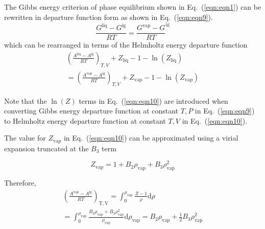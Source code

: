 \documentclass[%
 aip,
 jcp,
 sd,%
 amsmath,amssymb,
 reprint,%
]{revtex4-1}
\begin{document}
The Gibbs energy criterion of phase equilibrium shown in Eq.~(\ref{eqn:eqn1}) can be rewritten in departure function form as shown in Eq.~(\ref{eqn:eqn9}).
\begin{equation}
\frac{G^{\mathrm{liq}} -G^{\mathrm{ig}} }{RT} =\frac{G^{\mathrm{vap}} -G}{RT} ^{\mathrm{ig}} \label{eqn:eqn9}
\end{equation}
which can be rearranged in terms of the Helmholtz energy departure function
\begin{equation}
\begin{array}{l}
{\left(\frac{A^{\mathrm{liq}} -A^{\mathrm{ig}} }{RT} \right)_{T,V} +Z_{\mathrm{liq}} -1-\ln(Z_{\mathrm{liq}})} 
\\ 
{=\left(\frac{A^{\mathrm{vap}} -A^{\mathrm{ig}} }{RT} \right)_{T,V} +Z_{\mathrm{vap}} -1-\ln(Z_{\mathrm{vap}})}  
\end{array} 
\label{eqn:eqn10}
\end{equation}

Note that the $\ln(Z)$ terms in Eq.~(\ref{eqn:eqn10}) are introduced when converting Gibbs energy departure function at constant $T,P$ in Eq.~(\ref{eqn:eqn9}) to Helmholtz energy departure function at constant $T,V$ in Eq.~(\ref{eqn:eqn10}).

The value for $Z_{\mathrm{vap}}$ in Eq.~(\ref{eqn:eqn10}) can be approximated using a virial expansion truncated at the $B_3$ term

\begin{equation}
{Z_{\mathrm{vap}}} = 1 + {B_2}{\rho_{\mathrm{vap}}} + {B_3}\rho_{\mathrm{vap}}^2
\label{eqn:eqn11}
\end{equation}

Therefore, 
\begin{equation}
\begin{array}{l}{\left( {\frac{{{A^{\mathrm{vap}}} - {A^{\mathrm{ig}}}}}{{RT}}} \right)_{\mathrm{T,V}}} = \int_0^{{\rho _{\mathrm{vap}}}} {\frac{{Z - 1}}{\rho } \mathrm{d}\rho } \\ = \int_0^{{\rho
_{\mathrm{vap}}}} {\frac{{{B_2}{\rho _{\mathrm{vap}}} + {B_3}\rho _{\mathrm{vap}}^2}}{\rho_{\mathrm{vap}} } \mathrm{d}\rho_{\mathrm{vap}} } = {B_2}{\rho _{\mathrm{vap}}} + \frac{1}{2}{B_3}\rho _{\mathrm{vap}}^2\end{array} \label{eqn:eqn12}
\end{equation}
\end{document}
